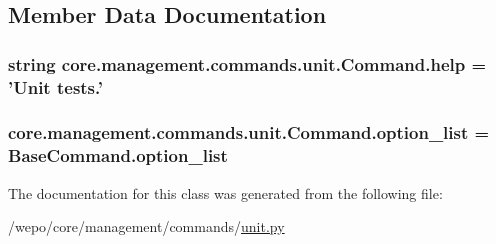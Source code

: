 \subsection{Member Data Documentation}
\hypertarget{classcore_1_1management_1_1commands_1_1unit_1_1Command_afa3ee03895753060f709326a6a403651}{
\subsubsection[{help}]{\setlength{\rightskip}{0pt plus 5cm}string core.\-management.\-commands.\-unit.\-Command.\-help = 'Unit tests.'\hspace{0.3cm}{\ttfamily [static]}}}\label{classcore_1_1management_1_1commands_1_1unit_1_1Command_afa3ee03895753060f709326a6a403651}
\hypertarget{classcore_1_1management_1_1commands_1_1unit_1_1Command_a72c89b56acfcfbda87b8401adf0efa54}{
\subsubsection[{option\-\_\-list}]{\setlength{\rightskip}{0pt plus 5cm}core.\-management.\-commands.\-unit.\-Command.\-option\-\_\-list = Base\-Command.\-option\-\_\-list\hspace{0.3cm}{\ttfamily [static]}}}\label{classcore_1_1management_1_1commands_1_1unit_1_1Command_a72c89b56acfcfbda87b8401adf0efa54}


The documentation for this class was generated from the following file\-:\begin{DoxyCompactItemize}
\item 
/wepo/core/management/commands/\hyperlink{unit_8py}{unit.\-py}\end{DoxyCompactItemize}
